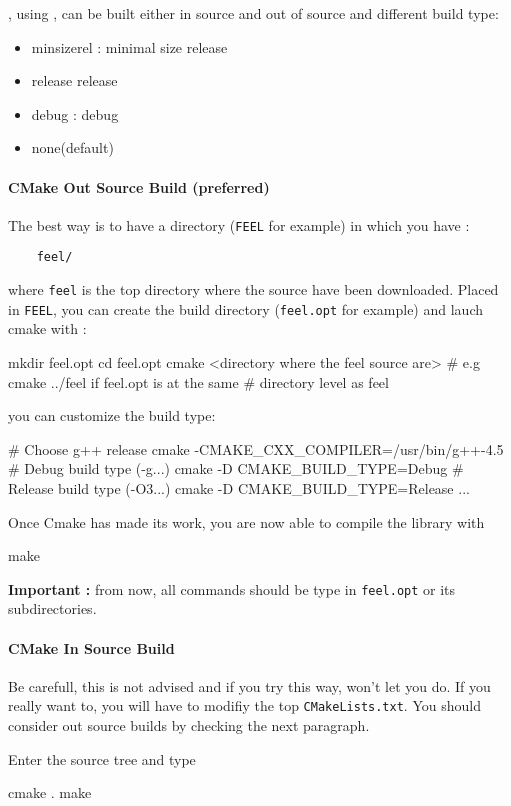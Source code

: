\feel, using \cmake, can be built either in source and out of source and different
build type:
\begin{itemize}
\item minsizerel : minimal size release
\item release release
\item debug : debug
\item none(default)
\end{itemize}

\paragraph{CMake Out Source Build (preferred)}
The best way is to have a directory (\lstinline|FEEL| for example) in which you have : \\
\begin{lstlisting}
	feel/
\end{lstlisting}
where \lstinline|feel| is the top directory where the source have been downloaded. Placed in \lstinline|FEEL|, you can create the build directory (\lstinline|feel.opt| for example) and lauch cmake with :
\begin{unixcom}
  mkdir feel.opt
  cd feel.opt
  cmake <directory where the feel source are>
  # e.g cmake ../feel if feel.opt is at the same
  # directory level as feel
\end{unixcom}
you can customize the build type:
\begin{unixcom}
  # Choose g++ release
  cmake -CMAKE_CXX_COMPILER=/usr/bin/g++-4.5
  # Debug build type (-g...)
  cmake -D CMAKE_BUILD_TYPE=Debug
  # Release build type (-O3...)
  cmake -D CMAKE_BUILD_TYPE=Release
  ...
\end{unixcom}
Once Cmake has made its work, you are now able to compile the library with
\begin{unixcom}
		make
\end{unixcom}
\textbf{Important :} from now, all commands should be type in \lstinline|feel.opt| or its subdirectories.
\paragraph{CMake In Source Build}

Be carefull, this is not advised and if you try this way, \cmake won't let you do. If you really want to, you will have to modifiy the top \lstinline|CMakeLists.txt|. You should consider out source builds by checking the next paragraph.

Enter the source tree and type
\begin{unixcom}
  cmake .
  make
\end{unixcom}

